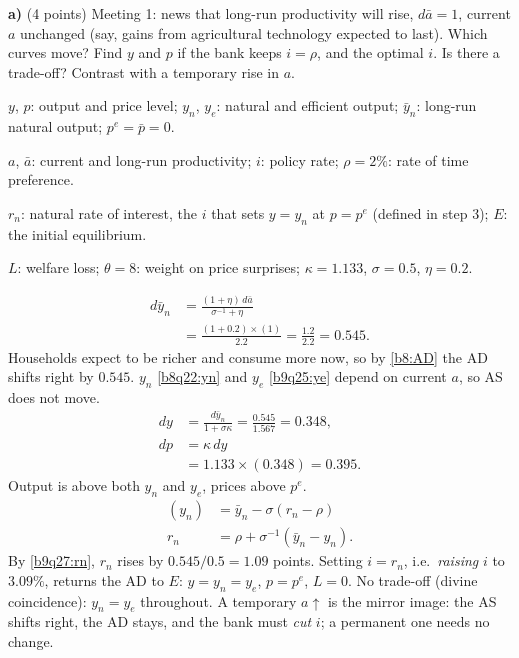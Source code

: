 \textbf{a)} (4 points) Meeting 1: news that long-run productivity will rise, $d\bar a=1$, current $a$ unchanged (say, gains from
agricultural technology expected to last). Which curves move? Find $y$ and $p$ if the bank keeps $i=\rho$, and the optimal $i$.
Is there a trade-off? Contrast with a temporary rise in $a$.
\resolespaco
\begin{sol}
\begin{notacao}
\item $y$, $p$: output and price level; $y_n$, $y_e$: natural and efficient output; $\bar y_n$: long-run natural output; $p^e=\bar p=0$.
\item $a$, $\bar a$: current and long-run productivity; $i$: policy rate; $\rho=2\%$: rate of time preference.
\item $r_n$: natural rate of interest, the $i$ that sets $y=y_n$ at $p=p^e$ (defined in step 3); $E$: the initial equilibrium.
\item $L$: welfare loss; $\theta=8$: weight on price surprises; $\kappa=1.133$, $\sigma=0.5$, $\eta=0.2$.
\end{notacao}
\begin{align*}
d\bar y_n&=\frac{(1+\eta)\,d\bar a}{\sigma^{-1}+\eta}\\
&=\frac{(1+0.2)\times(1)}{2.2}=\frac{1.2}{2.2}=0.545 .
\end{align*}
Households expect to be richer and consume more now, so by \eqref{b8:AD} the AD shifts right by $0.545$. $y_n$ \eqref{b8q22:yn} and $y_e$
\eqref{b9q25:ye} depend on current $a$, so AS does not move.
\begin{align*}
dy&=\frac{d\bar y_n}{1+\sigma\kappa}=\frac{0.545}{1.567}=0.348,\\
dp&=\kappa\,dy\\
&=1.133\times(0.348)=0.395 .
\end{align*}
Output is above both $y_n$ and $y_e$, prices above $p^e$.
\begin{align}
(y_n)&=\bar y_n-\sigma(r_n-\rho)\nonumber\\
r_n&=\rho+\sigma^{-1}(\bar y_n-y_n). \label{b9q27:rn}
\end{align}
By \eqref{b9q27:rn}, $r_n$ rises by $0.545/0.5=1.09$ points. Setting $i=r_n$, i.e.\ \emph{raising} $i$ to $3.09\%$, returns the AD to $E$:
$y=y_n=y_e$, $p=p^e$, $L=0$. No trade-off (divine coincidence): $y_n=y_e$ throughout. A temporary $a\uparrow$ is the mirror image:
the AS shifts right, the AD stays, and the bank must \emph{cut} $i$; a permanent one needs no change.
\end{sol}

